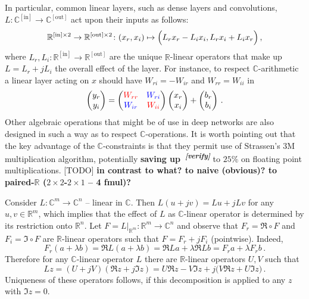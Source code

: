 \documentclass[a4paper,10pt]{article}
\newcommand{\important}[1]{\textbf{\color{red} #1}}
\newcommand{\attn}[2]{\textbf{\color{red} #2~\textsuperscript{\textit{[#1]}}}}
\newcommand{\verify}[1]{\attn{verify}{#1}}
\newcommand{\todo}[1]{{\color{blue} [TODO]} \important{#1}}
\newcommand{\real}{\mathbb{R}}
\newcommand{\cplx}{\mathbb{C}}
\begin{document}
In particular, common linear layers, such as dense layers and convolutions,
$
  L \colon \cplx^{\mathrm{[in]}}
    \to \cplx^{\mathrm{[out]}}
$ act upon their inputs as follows:
$$
\real^{\mathrm{[in]} \times 2}
  \to \real^{\mathrm{[out]} \times 2}
  \colon (x_r, x_i)
    \mapsto \Bigl(
      L_r x_r - L_i x_i,
      L_r x_i + L_i x_r
    \Bigr)
  \,, $$
where $
  L_r, L_i
    \colon \real^{\mathrm{[in]}}
      \to \real^{\mathrm{[out]}}
$ are the unique $\real$-linear operators that make up $L = L_r + j L_i$ the overall
effect of the layer. For instance, to respect $\cplx$-arithmetic a linear layer acting
on $x$ should have $W_{ri} = - W_{ir}$ and $W_{rr} = W_{ii}$ in
$$
  \begin{pmatrix}
    y_r \\ y_i
  \end{pmatrix}
    = \begin{pmatrix}
      {\color{red} W_{rr}} & {\color{blue} W_{ri}} \\ 
      {\color{blue} W_{ir}} & {\color{red} W_{ii}}
    \end{pmatrix}
    \begin{pmatrix}
      x_r \\ x_i
    \end{pmatrix}
    + \begin{pmatrix}
      b_r \\ b_i
    \end{pmatrix}
  \,. $$
Other algebraic operations that might be of use in deep networks are also designed in such
a way as to respect $\cplx$-operations. It is worth pointing out that the key advantage of
the $\cplx$-constraints is that they permit use of Strassen's $3$M multiplication algorithm,
potentially \verify{saving up} to $25\%$ on floating point multiplications. \todo{
  in contrast to what? to na{\:i}ve (obvious)? to paired-$\real$ ($2 \times 2$-$2\times 1$
  -- 4 fmul)?
}

Consider $L \colon \cplx^m \to \cplx^n$ -- linear in $\cplx$. Then $
  L(u + jv) = L u + j L v
$ for any $u, v \in \real^m$, which implies that the effect of $L$ as $\cplx$-linear
operator is determined by its restriction onto $\real^n$. Let $
  F = L\vert_{\real^m}
  \colon \real^m \to \cplx^n
$ and observe that $F_r = \Re \circ F$ and $F_i = \Im \circ F$ are $\real$-linear operators
such that $F = F_r + j F_i$ (pointwise). Indeed,
$$
  F_r(a + \lambda b)
  = \Re L(a + \lambda b)
  = \Re L a + \lambda \Re L b
  = F_r a + \lambda F_r b
  \,. $$
Therefore for any $\cplx$-linear operator $L$ there are $\real$-linear operators $U, V$
such that
$$
L z 
  = (U + j V) (\Re z + j \Im z)
  = U \Re z - V \Im z + j \bigl( V \Re z + U \Im z \bigr)
  \,. $$
Uniqueness of these operators follows, if this decomposition is applied to any $z$ with
$\Im z = 0$.
\end{document}
